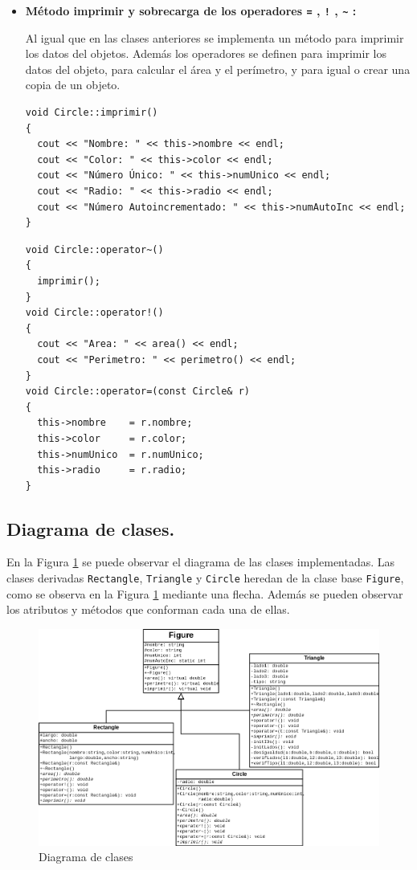 \begin{itemize}
\item \textbf{Método imprimir y sobrecarga de los operadores \texttt{=} , \texttt{!} , \texttt{\~} :}

Al igual que en las clases anteriores se implementa un método para imprimir los datos del objetos. Además los operadores se definen para imprimir los datos del objeto, para calcular el área y el perímetro, y para igual o crear una copia de un objeto.

\begin{verbatim}
void Circle::imprimir()
{
  cout << "Nombre: " << this->nombre << endl;
  cout << "Color: " << this->color << endl;
  cout << "Número Único: " << this->numUnico << endl;
  cout << "Radio: " << this->radio << endl;
  cout << "Número Autoincrementado: " << this->numAutoInc << endl;
}
\end{verbatim}
\begin{verbatim}
void Circle::operator~()
{
  imprimir();
}
void Circle::operator!()
{
  cout << "Area: " << area() << endl;
  cout << "Perimetro: " << perimetro() << endl;
}
void Circle::operator=(const Circle& r)
{
  this->nombre    = r.nombre;
  this->color     = r.color;
  this->numUnico  = r.numUnico;
  this->radio     = r.radio;
}
\end{verbatim}


\end{itemize}

\subsection{Diagrama de clases.}
En la Figura \ref{fig:dia} se puede observar el diagrama de las clases implementadas. Las clases derivadas \texttt{Rectangle}, \texttt{Triangle} y \texttt{Circle} heredan de la clase base \texttt{Figure}, como se observa en la Figura \ref{fig:dia} mediante una flecha. Además se pueden observar los atributos y métodos que conforman cada una de ellas.
\begin{figure}[H]
  \centering
    \includegraphics[width=\textwidth]{imgs/Labo3/Diagram1.png}
  \caption{Diagrama de clases}
  \label{fig:dia}
\end{figure}

